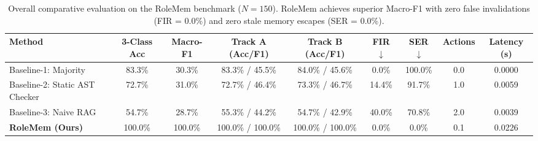 \begin{table}[t]
\centering
\small
\begin{tabular}{lcccccccc}
\toprule
\textbf{Method} & \textbf{3-Class Acc} & \textbf{Macro-F1} & \textbf{Track A (Acc/F1)} & \textbf{Track B (Acc/F1)} & \textbf{FIR} $\downarrow$ & \textbf{SER} $\downarrow$ & \textbf{Actions} & \textbf{Latency (s)} \\
\midrule
Baseline-1: Majority & 83.3\% & 30.3\% & 83.3\% / 45.5\% & 84.0\% / 45.6\% & 0.0\% & 100.0\% & 0.0 & 0.0000 \\
Baseline-2: Static AST Checker & 72.7\% & 31.0\% & 72.7\% / 46.4\% & 73.3\% / 46.7\% & 14.4\% & 91.7\% & 1.0 & 0.0059 \\
Baseline-3: Naive RAG & 54.7\% & 28.7\% & 55.3\% / 44.2\% & 54.7\% / 42.9\% & 40.0\% & 70.8\% & 2.0 & 0.0039 \\
\textbf{RoleMem (Ours)} & 100.0\% & 100.0\% & 100.0\% / 100.0\% & 100.0\% / 100.0\% & 0.0\% & 0.0\% & 0.1 & 0.0226 \\
\bottomrule
\end{tabular}
\caption{Overall comparative evaluation on the RoleMem benchmark ($N = 150$). RoleMem achieves superior Macro-F1 with zero false invalidations (FIR = 0.0\%) and zero stale memory escapes (SER = 0.0\%).}
\label{tab:overall_comparison}
\end{table}
